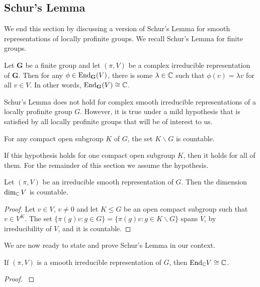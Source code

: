 \subsection{Schur's Lemma}

We end this section by discussing a version of Schur's Lemma for smooth representations of locally profinite groups. We recall Schur's Lemma for finite groups.

\begin{thm}
    Let $\mathbf{G}$ be a finite group and let $(\pi,V)$ be a complex irreducible representation of $\mathbf G$. Then for any $\phi\in\mathrm{End}_{\mathbf{G}}(V)$, there is some $\lambda\in\mathbb{C}$ such that $\phi(v)=\lambda v$ for all $v\in V$. In other words, $\mathrm{End}_{\mathbf{G}}(V)\cong\mathbb{C}$.
\end{thm}

Schur's Lemma does not hold for complex smooth irreducible representations of a locally profinite group $G$. However, it is true under a mild hypothesis that is satisfied by all locally profinite groups that will be of interest to us.

\begin{hypothesis}
    For any compact open subgroup $K$ of $G$, the set $K\backslash G$ is countable.
\end{hypothesis}

If this hypothesis holds for one compact open subgroup $K$, then it holds for all of them. For the remainder of this section we assume the hypothesis.


\begin{lemma}
    Let $(\pi,V)$ be an irreducible smooth representation of $G$. Then the dimension $\dim_{\mathbb{C}}V$ is countable.
\end{lemma}
\begin{proof}
    Let $v\in V$, $v\neq0$ and let $K \leq G$ be an open compact subgroup such that $v\in V^K$. The set $\{\pi(g)v:g\in G\}=\{\pi(g)v:g\in K\backslash G\}$ spans $V$, by irreducibility of $V$, and it is countable.
\end{proof}

We are now ready to state and prove Schur's Lemma in our context.

\begin{thm}\label{thm:schur}
    If $(\pi,V)$ is a smooth irreducible representation of $G$, then $\mathrm{End}_{\mathbb{C}}V\cong \mathbb{C}$.
\end{thm}
\begin{proof}
    \cite[2.6 Schur's Lemma]{BH1}
\end{proof}

